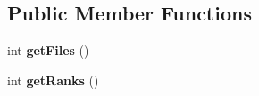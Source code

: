 \subsection*{Public Member Functions}
\begin{DoxyCompactItemize}
\item 
int {\bfseries get\+Files} ()\hypertarget{classedu_1_1xwei12_1_1_chess_1_1_rectangle_board_a20f4c0f3d20ee7a13a233244cd1f9f88}{}\label{classedu_1_1xwei12_1_1_chess_1_1_rectangle_board_a20f4c0f3d20ee7a13a233244cd1f9f88}

\item 
int {\bfseries get\+Ranks} ()\hypertarget{classedu_1_1xwei12_1_1_chess_1_1_rectangle_board_a7e4e4fbf91a92bf26e9aaa3c3b420e88}{}\label{classedu_1_1xwei12_1_1_chess_1_1_rectangle_board_a7e4e4fbf91a92bf26e9aaa3c3b420e88}


\end{DoxyCompactItemize}

